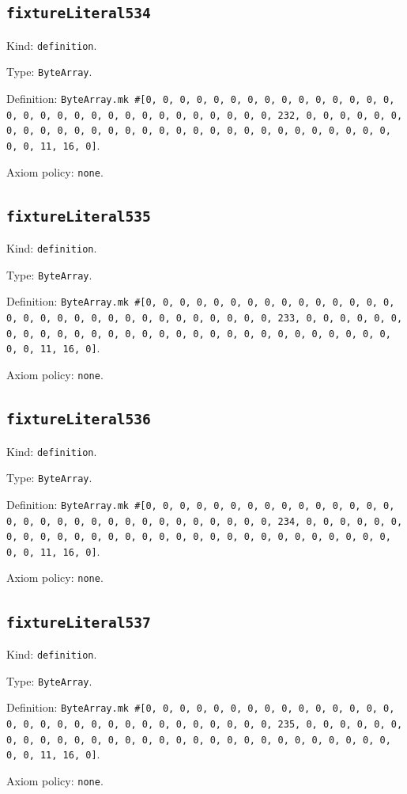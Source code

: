 \documentclass[11pt]{article}
\begin{document}
\subsection*{\texttt{fixtureLiteral534}}
\noindent Kind: \texttt{definition}.\par
\noindent Type: \texttt{ByteArray}.\par
\noindent Definition: \texttt{ByteArray.mk \#[0, 0, 0, 0, 0, 0, 0, 0, 0, 0, 0, 0, 0, 0, 0, 0, 0, 0, 0, 0, 0, 0, 0, 0, 0, 0, 0, 0, 0, 0, 0, 232, 0, 0, 0, 0, 0, 0, 0, 0, 0, 0, 0, 0, 0, 0, 0, 0, 0, 0, 0, 0, 0, 0, 0, 0, 0, 0, 0, 0, 0, 0, 0, 11, 16, 0]}.\par
\noindent Axiom policy: \texttt{none}.\par
\subsection*{\texttt{fixtureLiteral535}}
\noindent Kind: \texttt{definition}.\par
\noindent Type: \texttt{ByteArray}.\par
\noindent Definition: \texttt{ByteArray.mk \#[0, 0, 0, 0, 0, 0, 0, 0, 0, 0, 0, 0, 0, 0, 0, 0, 0, 0, 0, 0, 0, 0, 0, 0, 0, 0, 0, 0, 0, 0, 0, 233, 0, 0, 0, 0, 0, 0, 0, 0, 0, 0, 0, 0, 0, 0, 0, 0, 0, 0, 0, 0, 0, 0, 0, 0, 0, 0, 0, 0, 0, 0, 0, 11, 16, 0]}.\par
\noindent Axiom policy: \texttt{none}.\par
\subsection*{\texttt{fixtureLiteral536}}
\noindent Kind: \texttt{definition}.\par
\noindent Type: \texttt{ByteArray}.\par
\noindent Definition: \texttt{ByteArray.mk \#[0, 0, 0, 0, 0, 0, 0, 0, 0, 0, 0, 0, 0, 0, 0, 0, 0, 0, 0, 0, 0, 0, 0, 0, 0, 0, 0, 0, 0, 0, 0, 234, 0, 0, 0, 0, 0, 0, 0, 0, 0, 0, 0, 0, 0, 0, 0, 0, 0, 0, 0, 0, 0, 0, 0, 0, 0, 0, 0, 0, 0, 0, 0, 11, 16, 0]}.\par
\noindent Axiom policy: \texttt{none}.\par
\subsection*{\texttt{fixtureLiteral537}}
\noindent Kind: \texttt{definition}.\par
\noindent Type: \texttt{ByteArray}.\par
\noindent Definition: \texttt{ByteArray.mk \#[0, 0, 0, 0, 0, 0, 0, 0, 0, 0, 0, 0, 0, 0, 0, 0, 0, 0, 0, 0, 0, 0, 0, 0, 0, 0, 0, 0, 0, 0, 0, 235, 0, 0, 0, 0, 0, 0, 0, 0, 0, 0, 0, 0, 0, 0, 0, 0, 0, 0, 0, 0, 0, 0, 0, 0, 0, 0, 0, 0, 0, 0, 0, 11, 16, 0]}.\par
\noindent Axiom policy: \texttt{none}.\par
\end{document}
